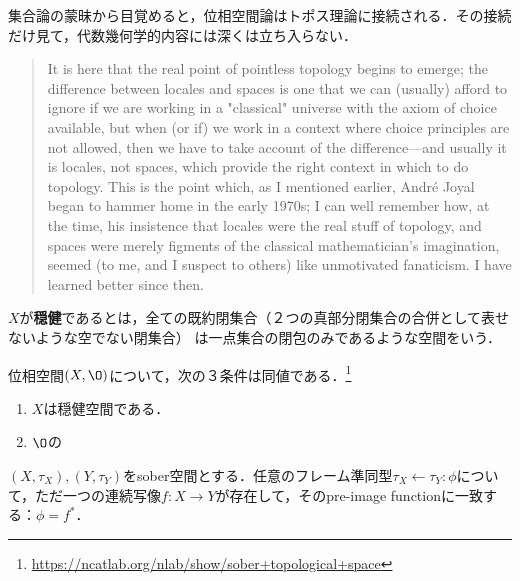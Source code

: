\documentclass[uplatex,dvipdfmx]{jsreport}
\begin{document}
\begin{screen}
    集合論の蒙昧から目覚めると，位相空間論はトポス理論に接続される．その接続だけ見て，代数幾何学的内容には深くは立ち入らない．
    \begin{quotation}
        It is here that the real point of pointless topology begins to emerge; the difference between locales and spaces is one that we can (usually) afford to ignore if we are working in a "classical" universe with the axiom of choice available, but when (or if) we work in a context where choice principles are not allowed, then we have to take account of the difference—and usually it is locales, not spaces, which provide the right context in which to do topology. This is the point which, as I mentioned earlier, André Joyal began to hammer home in the early 1970s; I can well remember how, at the time, his insistence that locales were the real stuff of topology, and spaces were merely figments of the classical mathematician's imagination, seemed (to me, and I suspect to others) like unmotivated fanaticism. I have learned better since then.\cite{Johnstone}
    \end{quotation}
\end{screen}

\begin{definition}\label{def-Soberity}
    $X$が\textbf{穏健}であるとは，全ての既約閉集合（２つの真部分閉集合の合併として表せないような空でない閉集合）
    は一点集合の閉包のみであるような空間をいう．
\end{definition}

\begin{proposition}[穏健空間の特徴付け]
    位相空間$(X,\O)$について，次の３条件は同値である．\footnote{\url{https://ncatlab.org/nlab/show/sober+topological+space}}
    \begin{enumerate}
        \item $X$は穏健空間である．
        \item $\O$の
    \end{enumerate}
\end{proposition}

\begin{proposition}[穏健空間は十分多くの点を持ったロケールである]\label{prop-sober-spaces-and-frame-homomorphism}
    $(X,\tau_X),(Y,\tau_Y)$をsober空間とする．任意のフレーム準同型$\tau_X\leftarrow\tau_Y:\phi$について，ただ一つの連続写像$f:X\to Y$が存在して，そのpre-image functionに一致する：$\phi=f^*$．
\end{proposition}
\end{document}
